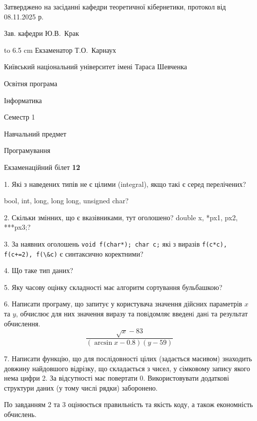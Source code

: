 \documentclass[12pt, ukrainian]{article}
\def\code#1{\Verb!#1!}
\begin{document}
{\smallskip\smallskip \begin {scriptsize} Затверджено на засіданні кафедри теоретичної кібернетики, протокол   від   08.11.2025 р.\par\smallskip\smallskip\smallskip\smallskip
{\parbox {6.5 cm} {Зав. кафедри \dotfill Ю.В.~Крак}}\hspace {0.7cm} {\hbox to 6.5 cm { Екзаменатор \dotfill Т.О.~Карнаух}} \end{scriptsize}}
\vspace{0.9cm}
{{\begin {scriptsize}\par
{ \center  Київський національний університет імені Тараса Шевченка \par}
{\parbox {5 cm}{Освітня програма \hfill}{\parbox {7 cm}{Інформатика\hfill}}\parbox {6 cm}{\hfill Семестр 1}}\par
{\parbox {5 cm} {Навчальний предмет \hfill}\parbox {7 cm}{Програмування \hfill}\parbox {6cm}{\hfill}\par}\vspace{-15pt} \end{scriptsize}}{\center Екзаменаційний білет \No \textbf { 12 }\par}}
{%
1. Які з наведених типів не є цілими (integral), якщо такі є серед перелічених?

bool, int, long, long long, unsigned char?
\par
\vspace{2mm}
2. Скільки змінних, що є вказівниками, тут оголошено?
double x, *px1, px2, ***px3;?
\par
\vspace{2mm}
3. За наявних оголошень \code{void f(char*); char c;} які з виразів \code{f(c*c), f(c+=2), f(\&c)} є синтаксично коректними?
\par
\vspace{2mm}
4. Що таке тип даних?
\par
\vspace{2mm}
5. Яку часову оцінку складності має алгоритм сортування бульбашкою?
\par
\vspace{2mm}
6. Написати програму, що запитує у користувача значення дійсних параметрів $x$ та $y$, обчислює для них значення виразу та повiдомляє введенi данi та результат обчислення.
$$\frac{\sqrt x - 83}{(\arcsin x - 0.8) (y - 59)}$$ 

\par
7. Написати функцію, що для послідовності цілих (задається масивом) знаходить довжину найдовшого відрізку, що складається з чисел, у сімковому запису якого нема цифри 2. За відсутності має повертати $0$. Використовувати додаткові структури даних (у тому числі рядки) заборонено.

По завданням 2 та 3 оцінюється правильність та якість коду, а також економність обчислень.

}
\end{document}
